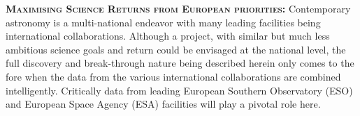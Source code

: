 \smallskip
\smallskip
\noindent
\textbf{\textsc{Maximising Science Returns from European priorities:}}
Contemporary astronomy is a multi-national endeavor with many leading
facilities being international collaborations. Although a project, with
similar but much less ambitious science goals and return could be
envisaged at the national level, the full discovery and break-through
nature being described herein only comes to the fore when the data
from the various international collaborations are combined
intelligently.  Critically data from leading European Southern
Observatory (ESO) and European Space Agency (ESA) facilities will play
a pivotal role here.




\smallskip

